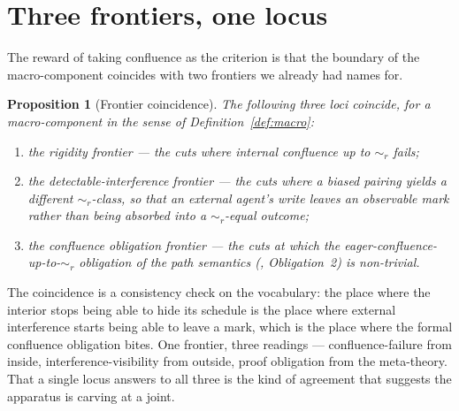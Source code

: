 \documentclass[11pt]{article}
\theoremstyle{definition}
\theoremstyle{plain}
\newtheorem{proposition}{Proposition}
\theoremstyle{remark}
\newcommand{\rbisim}{\sim_{r}}
\begin{document}
\section{Three frontiers, one locus}\label{sec:frontier}

The reward of taking confluence as the criterion is that the boundary of the
macro-component coincides with two frontiers we already had names for.

\begin{proposition}[Frontier coincidence]\label{prop:frontier}
The following three loci coincide, for a macro-component in the sense of
Definition~\ref{def:macro}:
\begin{enumerate}[label=(\roman*),leftmargin=2.2em]
\item the \emph{rigidity frontier} --- the cuts where internal confluence up to
$\rbisim$ fails;
\item the \emph{detectable-interference frontier} --- the cuts where a biased
pairing yields a different $\rbisim$-class, so that an external agent's write
leaves an observable mark rather than being absorbed into a $\rbisim$-equal
outcome;
\item the \emph{confluence obligation frontier} --- the cuts at which the
eager-confluence-up-to-$\rbisim$ obligation of the path semantics
(\cite{paths}, Obligation~2) is non-trivial.
\end{enumerate}
\end{proposition}

\noindent
The coincidence is a consistency check on the vocabulary: the place where the
interior stops being able to hide its schedule is the place where external
interference starts being able to leave a mark, which is the place where the
formal confluence obligation bites. One frontier, three readings ---
confluence-failure from inside, interference-visibility from outside, proof
obligation from the meta-theory. That a single locus answers to all three is the
kind of agreement that suggests the apparatus is carving at a joint.
\end{document}
